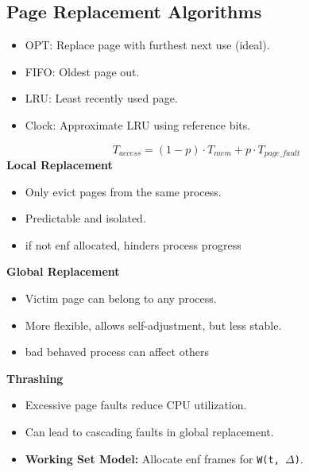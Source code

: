 \documentclass[8pt,twocolumn]{article}
\begin{document}
\subsection*{Page Replacement Algorithms}
\vspace{-0.6em}
\begin{itemize}
    \setlength{\itemsep}{0pt} %
    \setlength{\parskip}{0pt}
  \item OPT: Replace page with furthest next use (ideal).
  \item FIFO: Oldest page out.
  \item LRU: Least recently used page.
  \item Clock: Approximate LRU using reference bits.
\end{itemize}
\vspace{-1.0em}
\[
T_{access} = (1 - p) \cdot T_{mem} + p \cdot T_{page\_fault}
\]
\textbf{Local Replacement}
\vspace{-1.0em}
\begin{itemize}
    \setlength{\itemsep}{0pt} %
    \setlength{\parskip}{0pt}
  \item Only evict pages from the same process.
  \item Predictable and isolated.
  \item if not enf allocated, hinders process progress
\end{itemize}
\vspace{-0.6em}
\textbf{Global Replacement}
\vspace{-0.6em}
\begin{itemize}
    \setlength{\itemsep}{0pt} %
    \setlength{\parskip}{0pt}
  \item Victim page can belong to any process.
  \item More flexible, allows self-adjustment, but less stable.
  \item bad behaved process can affect others
\end{itemize}
\vspace{-0.6em}
\textbf{Thrashing}
\vspace{-0.6em}
\begin{itemize}
    \setlength{\itemsep}{0pt} %
    \setlength{\parskip}{0pt}
  \item Excessive page faults reduce CPU utilization.
  \item Can lead to cascading faults in global replacement.
  \item \textbf{Working Set Model:} Allocate enf frames for \texttt{W(t, $\Delta$)}.
\end{itemize}
\end{document}
